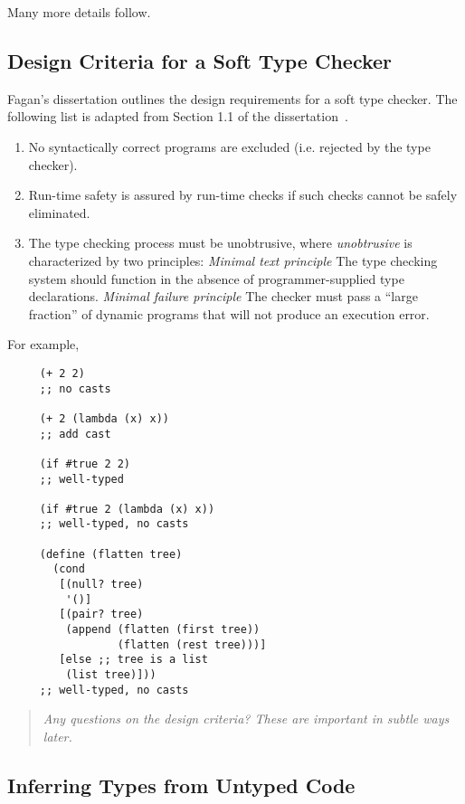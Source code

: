 \documentclass{article}
\begin{document}
Many more details follow.


\subsection*{Design Criteria for a Soft Type Checker}

Fagan's dissertation outlines the design requirements for a soft type checker.
The following list is adapted from Section 1.1 of the dissertation~\cite{f-thesis-1991}.
\begin{enumerate}
\item
  No syntactically correct programs are excluded (i.e. rejected by the type checker).
\item
  Run-time safety is assured by run-time checks if such checks cannot be
  safely eliminated.
\item
  The type checking process must be unobtrusive, where \emph{unobtrusive} is
  characterized by two principles:
\subitem \emph{Minimal text principle}
  The type checking system should function in the absence of
  programmer-supplied type declarations.
\subitem \emph{Minimal failure principle}
  The checker must pass a ``large fraction'' of dynamic programs that will not
  produce an execution error.
\end{enumerate}

For example,
\begin{verbatim}
     (+ 2 2)
     ;; no casts

     (+ 2 (lambda (x) x))
     ;; add cast

     (if #true 2 2)
     ;; well-typed

     (if #true 2 (lambda (x) x))
     ;; well-typed, no casts

     (define (flatten tree)
       (cond
        [(null? tree)
         '()]
        [(pair? tree)
         (append (flatten (first tree))
                 (flatten (rest tree)))]
        [else ;; tree is a list
         (list tree)]))
     ;; well-typed, no casts
\end{verbatim}

\begin{quote}
  \emph{Any questions on the design criteria? These are important in subtle ways later.}
\end{quote}


\subsection*{Inferring Types from Untyped Code}
\end{document}
